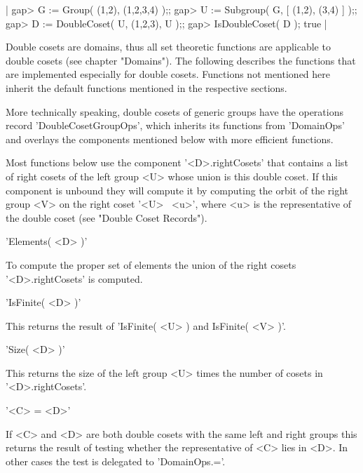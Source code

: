 |    gap> G := Group( (1,2), (1,2,3,4) );;
    gap> U := Subgroup( G, [ (1,2), (3,4) ] );;
    gap> D := DoubleCoset( U, (1,2,3), U );;
    gap> IsDoubleCoset( D );
    true |

%

Double  cosets  are   domains,  thus  all  set  theoretic  functions  are
applicable to  double  cosets  (see  chapter  "Domains").   The following
describes  the  functions  that  are  implemented  especially for  double
cosets.   Functions  not mentioned  here  inherit  the default  functions
mentioned in the respective sections.

More technically  speaking, double  cosets  of generic   groups  have the
operations  record 'DoubleCosetGroupOps',   which inherits its  functions
from 'DomainOps'  and overlays  the components mentioned  below with more
efficient functions.

Most functions below use  the component '<D>.rightCosets' that contains a
list of right cosets of the  left  group <U> whose  union is  this double
coset.  If this  component  is unbound they  will compute it by computing
the orbit of the right group <V> on the right coset  '<U> \*\ <u>', where
<u>  is the  representative  of  the  double   coset (see "Double   Coset
Records").

\vspace{5mm}
'Elements( <D> )'%

To compute the  proper set of  elements the  union   of the right  cosets
'<D>.rightCosets' is computed.

\vspace{5mm}
'IsFinite( <D> )'%

This returns the result of 'IsFinite( <U> ) and IsFinite( <V> )'.

\vspace{5mm}
'Size( <D> )'%

This returns the size of the left group <U> times the number of cosets in
'<D>.rightCosets'.

\vspace{5mm}
'<C> = <D>'%

If <C> and <D> are both double cosets with the same left and right groups
this returns the result of testing whether the representative of <C> lies
in <D>.  In other cases the test is delegated to 'DomainOps.='.


